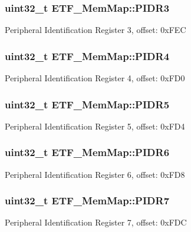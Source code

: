 \subsubsection[{P\+I\+D\+R3}]{\setlength{\rightskip}{0pt plus 5cm}uint32\+\_\+t E\+T\+F\+\_\+\+Mem\+Map\+::\+P\+I\+D\+R3}\label{struct_e_t_f___mem_map_a1132bf279f207a39e89f2fab3d384308}
Peripheral Identification Register 3, offset\+: 0x\+F\+E\+C \hypertarget{struct_e_t_f___mem_map_a955a81d9c5e73e129ca965fa226bfde8}{}
\subsubsection[{P\+I\+D\+R4}]{\setlength{\rightskip}{0pt plus 5cm}uint32\+\_\+t E\+T\+F\+\_\+\+Mem\+Map\+::\+P\+I\+D\+R4}\label{struct_e_t_f___mem_map_a955a81d9c5e73e129ca965fa226bfde8}
Peripheral Identification Register 4, offset\+: 0x\+F\+D0 \hypertarget{struct_e_t_f___mem_map_a3054ae260a217f950e2c7793ff27855d}{}
\subsubsection[{P\+I\+D\+R5}]{\setlength{\rightskip}{0pt plus 5cm}uint32\+\_\+t E\+T\+F\+\_\+\+Mem\+Map\+::\+P\+I\+D\+R5}\label{struct_e_t_f___mem_map_a3054ae260a217f950e2c7793ff27855d}
Peripheral Identification Register 5, offset\+: 0x\+F\+D4 \hypertarget{struct_e_t_f___mem_map_a3448111767c72273ead546c08f49047b}{}
\subsubsection[{P\+I\+D\+R6}]{\setlength{\rightskip}{0pt plus 5cm}uint32\+\_\+t E\+T\+F\+\_\+\+Mem\+Map\+::\+P\+I\+D\+R6}\label{struct_e_t_f___mem_map_a3448111767c72273ead546c08f49047b}
Peripheral Identification Register 6, offset\+: 0x\+F\+D8 \hypertarget{struct_e_t_f___mem_map_a53393d8ce48a43bed1d5568561776a5c}{}
\subsubsection[{P\+I\+D\+R7}]{\setlength{\rightskip}{0pt plus 5cm}uint32\+\_\+t E\+T\+F\+\_\+\+Mem\+Map\+::\+P\+I\+D\+R7}\label{struct_e_t_f___mem_map_a53393d8ce48a43bed1d5568561776a5c}
Peripheral Identification Register 7, offset\+: 0x\+F\+D\+C 

